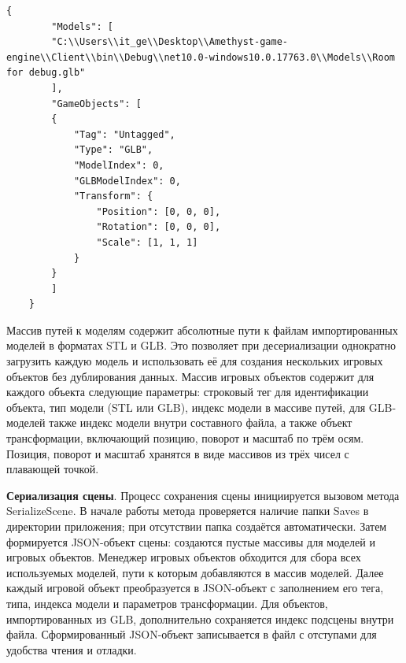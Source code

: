 \begin{lstlisting}[caption={Пример JSON-файла сохранённой сцены}, label=lst:scene_json]
	{
		"Models": [
		"C:\\Users\\it_ge\\Desktop\\Amethyst-game-engine\\Client\\bin\\Debug\\net10.0-windows10.0.17763.0\\Models\\Room for debug.glb"
		],
		"GameObjects": [
		{
			"Tag": "Untagged",
			"Type": "GLB",
			"ModelIndex": 0,
			"GLBModelIndex": 0,
			"Transform": {
				"Position": [0, 0, 0],
				"Rotation": [0, 0, 0],
				"Scale": [1, 1, 1]
			}
		}
		]
	}
\end{lstlisting}

Массив путей к моделям содержит абсолютные пути к файлам импортированных моделей в форматах STL и GLB. Это позволяет при десериализации однократно загрузить каждую модель и использовать её для создания нескольких игровых объектов без дублирования данных. Массив игровых объектов содержит для каждого объекта следующие параметры: строковый тег для идентификации объекта, тип модели (STL или GLB), индекс модели в массиве путей, для GLB-моделей также индекс модели внутри составного файла, а также объект трансформации, включающий позицию, поворот и масштаб по трём осям. Позиция, поворот и масштаб хранятся в виде массивов из трёх чисел с плавающей точкой.

\textbf{Сериализация сцены}. Процесс сохранения сцены инициируется вызовом метода SerializeScene. В начале работы метода проверяется наличие папки Saves в директории приложения; при отсутствии папка создаётся автоматически. Затем формируется JSON-объект сцены: создаются пустые массивы для моделей и игровых объектов. Менеджер игровых объектов обходится для сбора всех используемых моделей, пути к которым добавляются в массив моделей. Далее каждый игровой объект преобразуется в JSON-объект с заполнением его тега, типа, индекса модели и параметров трансформации. Для объектов, импортированных из GLB, дополнительно сохраняется индекс подсцены внутри файла. Сформированный JSON-объект записывается в файл с отступами для удобства чтения и отладки.

